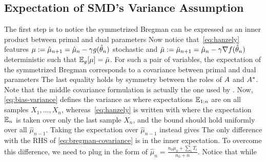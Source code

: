 \subsection{Expectation of SMD's Variance Assumption}
The first step is to notice the symmetrized Bregman can be expressed as an inner product between primal and dual parameters
Now notice that~\eqref{eq:hanzely} features $\mu := \hat \mu_{n+1} = \hat{\mu}_{n} - \gamma g(\hat {\theta}_{n})$ stochastic and $\bar\mu := \bar\mu_{n+1} =  \hat{\mu}_{n}   -\gamma \nabla f(\hat {\theta}_{n})$ deterministic such that $\operatorname{\mathbb{E}}_g[\mu] = \bar\mu$.
For such a pair of variables, the expectation of the symmetrized Bregman corresponds to a covariance between primal and dual parameters
The last equality holds by symmetry between the roles of $A$ and ${A^*}$.
Note that the middle covariance formulation is actually the one  used by \citet{hanzely2018fastest}.
Now, \cref{eq:bias-variance} defines the variance as 
where expectations $\operatorname{\mathbb{E}}_{1:n}$ are on all samples $X_1, \dots, X_n$, whereas~\eqref{eq:hanzely} is written with 
where the expectation $\operatorname{\mathbb{E}}_{n}$ is taken over only the last sample $X_n$, and the bound should hold uniformly over all $\hat\mu_{n-1}$.
Taking the expectation over $\hat\mu_{n-1}$ instead gives
The only difference with the RHS of \cref{eq:bregman-covariance} is in the inner expectation.
To overcome this difference, we need to plug in the form of $\hat \mu_n = \frac{n_0\mu_0 + \sum_i T_i}{n_0 +n}$. Notice that 
while
